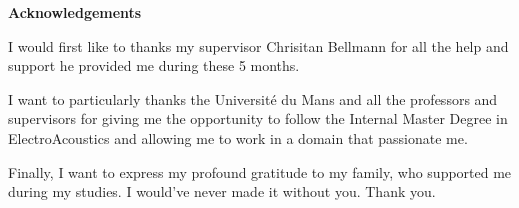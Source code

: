 \documentclass{report}
\newif\ifdraft
\begin{document}




\ifdraft
\listoftodos
\else
\thispagestyle{empty}
\begin{center}
{\Large\textbf{Acknowledgements}} 
\end{center}
\vspace{1cm}
I would first like to thanks my supervisor Chrisitan Bellmann for all the help and support he provided me during these 5 months. 

\vspace{0.5cm}

I want to particularly thanks the Université du Mans and all the professors and supervisors for giving me the opportunity to follow the Internal Master Degree in ElectroAcoustics and allowing me to work in a domain that passionate me. 

\vspace{0.5cm}

Finally, I want to express my profound gratitude to my family, who supported me during my studies. I would've never made it without you. Thank you.

\vfill %
\fi	%


\clearpage
\renewcommand\contentsname{Table of contents}
\tableofcontents
{} %

\clearpage
\listoffigures
{}

\clearpage
\listofmyequations
{}


    
\end{document}
